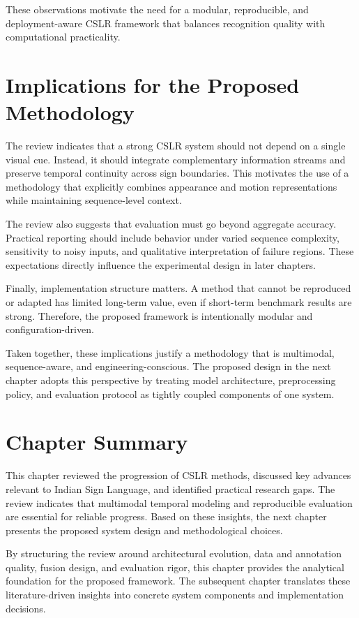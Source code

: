 These observations motivate the need for a modular, reproducible, and deployment-aware CSLR framework that balances recognition quality with computational practicality.

\section{Implications for the Proposed Methodology}

The review indicates that a strong CSLR system should not depend on a single visual cue. Instead, it should integrate complementary information streams and preserve temporal continuity across sign boundaries. This motivates the use of a methodology that explicitly combines appearance and motion representations while maintaining sequence-level context.

The review also suggests that evaluation must go beyond aggregate accuracy. Practical reporting should include behavior under varied sequence complexity, sensitivity to noisy inputs, and qualitative interpretation of failure regions. These expectations directly influence the experimental design in later chapters.

Finally, implementation structure matters. A method that cannot be reproduced or adapted has limited long-term value, even if short-term benchmark results are strong. Therefore, the proposed framework is intentionally modular and configuration-driven.

Taken together, these implications justify a methodology that is multimodal, sequence-aware, and engineering-conscious. The proposed design in the next chapter adopts this perspective by treating model architecture, preprocessing policy, and evaluation protocol as tightly coupled components of one system.

\section{Chapter Summary}

This chapter reviewed the progression of CSLR methods, discussed key advances relevant to Indian Sign Language, and identified practical research gaps. The review indicates that multimodal temporal modeling and reproducible evaluation are essential for reliable progress. Based on these insights, the next chapter presents the proposed system design and methodological choices.

By structuring the review around architectural evolution, data and annotation quality, fusion design, and evaluation rigor, this chapter provides the analytical foundation for the proposed framework. The subsequent chapter translates these literature-driven insights into concrete system components and implementation decisions.



